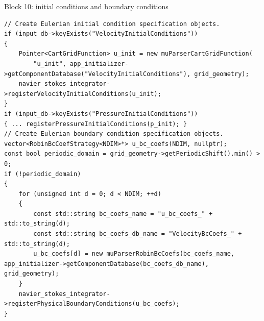 \documentclass[aspectratio=169,11pt]{beamer}
\begin{document}
\begin{frame}[fragile]{Block 10: initial conditions and boundary conditions}
\label{fr:icbc}
\begin{lstlisting}[style=cpptiny]
// Create Eulerian initial condition specification objects.
if (input_db->keyExists("VelocityInitialConditions"))
{
    Pointer<CartGridFunction> u_init = new muParserCartGridFunction(
        "u_init", app_initializer->getComponentDatabase("VelocityInitialConditions"), grid_geometry);
    navier_stokes_integrator->registerVelocityInitialConditions(u_init);
}
if (input_db->keyExists("PressureInitialConditions"))
{ ... registerPressureInitialConditions(p_init); }
// Create Eulerian boundary condition specification objects.
vector<RobinBcCoefStrategy<NDIM>*> u_bc_coefs(NDIM, nullptr);
const bool periodic_domain = grid_geometry->getPeriodicShift().min() > 0;
if (!periodic_domain)
{
    for (unsigned int d = 0; d < NDIM; ++d)
    {
        const std::string bc_coefs_name = "u_bc_coefs_" + std::to_string(d);
        const std::string bc_coefs_db_name = "VelocityBcCoefs_" + std::to_string(d);
        u_bc_coefs[d] = new muParserRobinBcCoefs(bc_coefs_name, app_initializer->getComponentDatabase(bc_coefs_db_name), grid_geometry);
    }
    navier_stokes_integrator->registerPhysicalBoundaryConditions(u_bc_coefs);
}
\end{lstlisting}
\end{frame}
\end{document}
